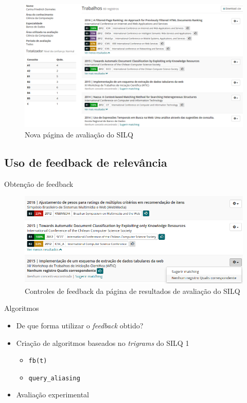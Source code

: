 \documentclass{beamer}
\begin{document}
\begin{frame}
  \begin{figure}
    \includegraphics[width=\textwidth]{figuras/avaliacao-silq2.png}
    \caption{Nova página de avaliação do SILQ}
  \end{figure}
\end{frame}

\subsection{Uso de feedback de relevância}

\begin{frame}{Obtenção de feedback}
  \begin{figure}
    \includegraphics[width=\textwidth]{figuras/feedbacks.png}
    \caption{Controles de feedback da página de resultados de avaliação do SILQ}
  \end{figure}
\end{frame}

\begin{frame}{Algoritmos}
  \begin{itemize}
    \item De que forma utilizar o \textit{feedback} obtido?
    \item Criação de algoritmos baseados no \textit{trigrams} do SILQ 1
    \begin{itemize}
      \item \texttt{fb(t)}
      \item \texttt{query\_aliasing}
    \end{itemize}
    \item Avaliação experimental
  \end{itemize}
\end{frame}
\end{document}
